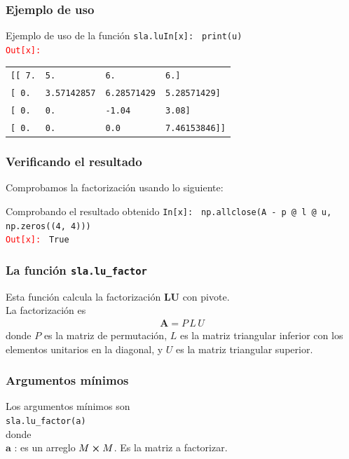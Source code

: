 \begin{frame}[fragile]
\frametitle{Ejemplo de uso}
\begin{exampleblock}{Ejemplo de uso de la función \texttt{sla.lu}}\textcolor{ao}{\texttt{In[x]: }} \texttt{print(u)} \\
\medskip    
\pause
\textcolor{red}{\texttt{Out[x]: }}
\fontsize{12}{12}\selectfont
\begin{table}
\begin{tabular}{l l l l}
\texttt{[[ 7.} & \texttt{5.} & \texttt{6.} & \texttt{6.]} \\
\texttt{[ 0.} & \texttt{3.57142857} & \texttt{6.28571429} & \texttt{5.28571429]} \\
\texttt{[ 0.} & \texttt{0.} & \texttt{-1.04} & \texttt{3.08]} \\
\texttt{[ 0.} & \texttt{0.} & \texttt{0.0} & \texttt{7.46153846]]}
\end{tabular}
\end{table}
\end{exampleblock}
\end{frame}
\begin{frame}
\frametitle{Verificando el resultado}
Comprobamos la factorización usando lo siguiente:
\begin{exampleblock}{Comprobando el resultado obtenido}
\textcolor{ao}{\texttt{In[x]: }} \texttt{np.allclose(A - p @ l @ u, np.zeros((4, 4)))} \\
\medskip
\pause
\textcolor{red}{\texttt{Out[x]: }} \texttt{True}
\end{exampleblock}
\end{frame}
\begin{frame}
\frametitle{La función \texttt{sla.lu\_factor}}
Esta función calcula la factorización $\mathbf{LU}$ con pivote.
\\
\bigskip
La factorización es
\begin{align*}
\mathbf{A} =  P \, L \, U 
\end{align*}
donde $P$ es la matriz de permutación, $L$ es la matriz triangular inferior con los elementos unitarios en la diagonal, y $U$ es la matriz triangular superior.
\end{frame}
\begin{frame}[fragile]
\frametitle{Argumentos mínimos}
Los argumentos mínimos son
\\
\medskip
\verb|sla.lu_factor(a)|
\\
\medskip
donde
\\
$\mathbf{a}$ : es un arreglo $M \cp M$. Es la matriz a factorizar.
\end{frame}
